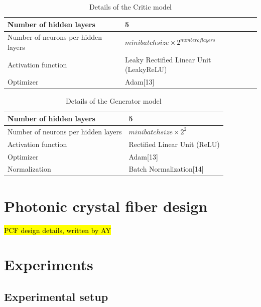 \documentclass[draft, a4, 10pt, onecolumn]{IEEEtran}
\begin{document}
\begin{table}[h]
\centering
\begin{tabular}{|l|l|}
\hline
Number of hidden layers & 5  \\
\hline
Number of neurons per hidden layers & $ minibatchsize\times2^{number of layers} $  \\
\hline
Activation function & Leaky Rectified Linear Unit (LeakyReLU)  \\
\hline
Optimizer & Adam[13]  \\
\hline
    \end{tabular}
\caption{Details of the Critic model}    
\end{table}

\begin{table}[h]
\centering
 \begin{tabular}{|l|l|}
    \hline
Number of hidden layers & 5 \\
\hline
Number of neurons per hidden layers & $ minibatchsize\times2^{2} $  \\
\hline
Activation function & Rectified Linear Unit (ReLU)  \\
\hline
Optimizer & Adam[13]  \\
\hline
Normalization & Batch Normalization[14] \\
\hline
    \end{tabular}
\caption{Details of the Generator model}
\end{table}

\section{Photonic crystal fiber design}
\label{sec:pcf}

\hl{PCF design details, written by AY}

\section{Experiments}
\label{sec:exp}

\subsection{Experimental setup}
\end{document}

